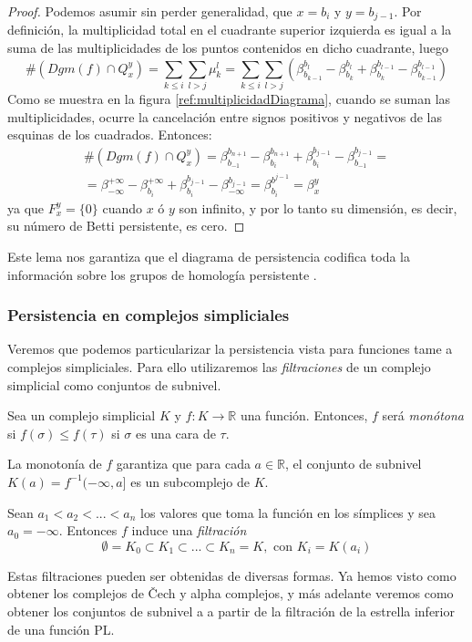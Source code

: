 \begin{proof}
Podemos asumir sin perder generalidad, que $x = b_i$ y $y = b_{j-1}$. Por definición, la multiplicidad total en el cuadrante superior izquierda es igual a la suma de las multiplicidades de los puntos contenidos en dicho cuadrante, luego
\[
\#(Dgm(f) \cap Q_{x}^{y}) = \sum_{k \leq i} \sum_{l > j}  \mu_{k}^{l} =
\sum_{k \leq i} \sum_{l > j} (\beta_{b_{k-1}}^{b_l} - \beta_{b_k}^{b_l} + \beta_{b_k}^{b_{l-1}} - \beta_{b_{k-1}}^{b_{l-1}})
\]
Como se muestra en la figura \ref{ref:multiplicidadDiagrama}, cuando se suman las multiplicidades, ocurre la cancelación entre signos positivos y negativos de las esquinas de los cuadrados. Entonces:
\begin{gather*}
\#(Dgm(f) \cap Q_{x}^{y}) = \beta_{b_{-1}}^{b_{n+1}} - \beta_{b_{i}}^{b_{n+1}} + \beta_{b_i}^{b_{j-1}} - \beta_{b_{-1}}^{b_{j-1}} =\\
= \beta_{-\infty}^{+\infty} - \beta_{b_{i}}^{+\infty} + \beta_{b_i}^{b_{j-1}} - \beta_{-\infty}^{b_{j-1}} = \beta_{b_i}^{b^{j-1}} = \beta_{x}^{y}
\end{gather*}
ya que $F_{x}^{y}= \{0\}$ cuando $x$ ó $y$ son infinito, y por lo tanto su dimensión, es decir, su número de Betti persistente, es cero.
\end{proof}

Este lema nos garantiza que el diagrama de persistencia codifica toda la información sobre los grupos de homología persistente \cite{libroEH}.

\subsubsection*{Persistencia en complejos simpliciales}
Veremos que podemos particularizar la persistencia vista para funciones tame a complejos simpliciales. Para ello utilizaremos las \emph{filtraciones} de un complejo simplicial como conjuntos de subnivel.

\begin{definition}
Sea un complejo simplicial $K$ y $f: K \to \mathbb{R}$ una función. Entonces, $f$ será \emph{monótona} si $f(\sigma) \leq f(\tau)$ si $\sigma$ es una cara de $\tau$.
\end{definition}
\begin{sloppypar}
La monotonía de $f$ garantiza que para cada $a \in \mathbb{R}$, el conjunto de subnivel ${K(a) = f^{-1}(-\infty,a]}$ es un subcomplejo de $K$.
\end{sloppypar}


\begin{definition}
Sean $a_1 < a_2 < ... < a_n$ los valores que toma la función en los símplices y sea $a_0 = -\infty$. Entonces $f$ induce una \emph{filtración}
\[
\emptyset = K_0 \subset K_1 \subset ... \subset K_n = K, \text{ con } K_i=K(a_i)
\]
\end{definition}
Estas filtraciones pueden ser obtenidas de diversas formas. Ya hemos visto como obtener los complejos de \v{C}ech y alpha complejos, y más adelante veremos como obtener los conjuntos de subnivel a a partir de la filtración de la estrella inferior de una función PL.

